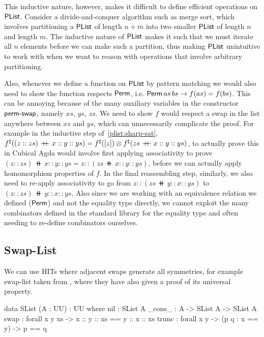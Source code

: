 This inductive nature, however, makes it difficult to define efficient operations on $\operatorname{\mathsf{PList}}$. Consider a
divide-and-conquer algorithm such as merge sort, which involves partitioning a $\operatorname{\mathsf{PList}}$ of length $n+m$ into
two smaller $\operatorname{\mathsf{PList}}$ of length $n$ and length $m$. The inductive nature of $\operatorname{\mathsf{PList}}$ makes it such that
we must iterate all $n$ elements before we can make such a partition, thus making $\operatorname{\mathsf{PList}}$ unintuitive
to work with when we want to reason with operations that involve arbitrary partitioning.

Also, whenever we define a function on $\operatorname{\mathsf{PList}}$ by pattern matching we would also need to show 
the function respects $\operatorname{\mathsf{Perm}}$, i.e. $\operatorname{\mathsf{Perm}} as\,bs \to f(as) = f(bs)$. This can be annoying because
of the many auxiliary variables in the constructor $\operatorname{\mathsf{perm-swap}}$, namely $xs$, $ys$, $zs$.
We need to show $f$ would respect a swap in the list anywhere between $xs$ and $ys$, which can 
unnecessarily complicate the proof. For example in the inductive step of~\cref{plist:sharp-sat},
${f}^{\sharp}((z :: zs)\,\mathbin{+\kern -0.4em+}\,x :: y :: ys) = {f}^{\sharp}([ z ]) \otimes {f}^{\sharp}(zs\,\mathbin{+\kern -0.4em+}\,x :: y :: ys)$,
to actually prove this in Cubical Agda would involve first applying associativity to prove
$(z :: zs)\,\doubleplus\,x :: y :: ys = z :: (zs\,\doubleplus\,x :: y :: ys)$, before we can actually
apply homomorphism properties of $f$. In the final reassembling step, similarly,
we also need to re-apply associativity to go from $z :: (zs\,\doubleplus\,y :: x :: ys)$
to $(z :: zs)\,\doubleplus\,y :: x :: ys$. Also since we are working with an equivalence relation we
defined ($\operatorname{\mathsf{Perm}}$) and not the equality type directly, we cannot exploit the many combinators defined
in the standard library for the equality type and often needing to re-define combinators ourselves.

\subsection{Swap-List}\label{cmon:slist}
We can use HITs where adjacent swaps generate all symmetries,
for example swap-list taken from \cite{choudhuryFreeCommutativeMonoids2023}, where they have
also given a proof of its universal property.

\begin{code}
data SList (A : UU) : UU where
  nil : SList A
  _cons_ : A -> SList A -> SList A
  swap : forall x y xs -> x :: y :: xs == y :: x :: xs 
  trunc : forall x y -> (p q : x == y) -> p == q
\end{code}
\vspace{1em}

